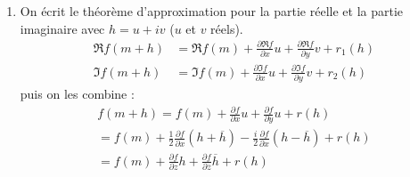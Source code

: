 \begin{enumerate}
 \item On écrit le théorème d'approximation pour la partie réelle et la partie imaginaire avec $h=u+iv$ ($u$ et $v$ réels).
\begin{align*}
 \Re f(m+h) &= \Re f(m) + \frac{\partial \Re f}{\partial x} u + \frac{\partial \Re f}{\partial y}v + r_1(h)\\
 \Im f(m+h) &= \Im f(m) + \frac{\partial \Im f}{\partial x} u + \frac{\partial \Im f}{\partial y}v + r_2(h)
\end{align*}
puis on les combine :
\begin{multline*}
 f(m+h) = f(m)+ \frac{\partial f}{\partial x} u + \frac{\partial f}{\partial y} u + r(h)\\
=f(m)+ \frac{1}{2}\frac{\partial f}{\partial x}(h+\overline{h}) - \frac{i}{2}\frac{\partial f}{\partial x}(h-\overline{h})+r(h)\\
=f(m)+\frac{\partial f}{\partial z} h + \frac{\partial f}{\partial \overline{z}} \overline{h} + r(h)
\end{multline*}

\end{enumerate}
